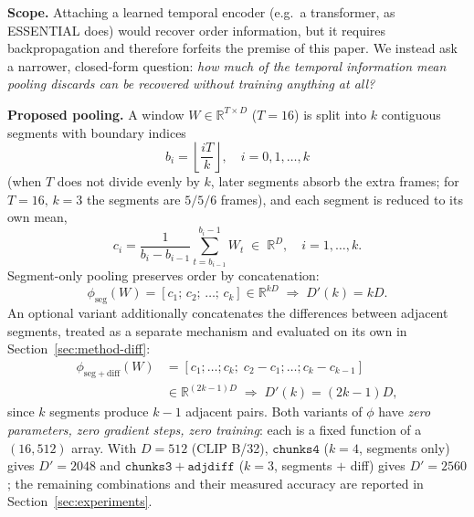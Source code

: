 \documentclass[a4paper,fleqn]{cas-dc}
\begin{document}
\textbf{Scope.} Attaching a learned temporal encoder (e.g.\ a
transformer, as ESSENTIAL does) would recover order information, but it
requires backpropagation and therefore forfeits the premise of this paper.
We instead ask a narrower, closed-form question: \emph{how much of the
temporal information mean pooling discards can be recovered without
training anything at all?}

\textbf{Proposed pooling.} A window $W \in \mathbb{R}^{T \times D}$
($T{=}16$) is split into $k$ contiguous segments with boundary indices
\begin{equation}
b_i = \left\lfloor \frac{iT}{k} \right\rfloor, \quad i = 0,1,\ldots,k
\end{equation}
(when $T$ does not divide evenly by $k$, later segments absorb the extra
frames; for $T{=}16,\,k{=}3$ the segments are $5/5/6$ frames), and each
segment is reduced to its own mean,
\begin{equation}
c_i = \frac{1}{b_i - b_{i-1}} \sum_{t=b_{i-1}}^{b_i - 1} W_t \;\in\; \mathbb{R}^D,
\quad i = 1,\ldots,k .
\end{equation}
Segment-only pooling preserves order by concatenation:
\begin{equation}
\phi_{\mathrm{seg}}(W) = [c_1;\,c_2;\,\ldots;\,c_k] \in \mathbb{R}^{kD}
\;\Longrightarrow\; D'(k) = kD .
\end{equation}
An optional variant additionally concatenates the differences between
adjacent segments, treated as a separate mechanism and evaluated on its own
in Section~\ref{sec:method-diff}:
\begin{equation}
\begin{split}
\phi_{\mathrm{seg+diff}}(W) &= [c_1;\ldots;c_k;\; c_2{-}c_1;\ldots;c_k{-}c_{k-1}]\\
&\in \mathbb{R}^{(2k-1)D}
\;\Longrightarrow\; D'(k) = (2k-1)D ,
\end{split}
\end{equation}
since $k$ segments produce $k{-}1$ adjacent pairs. Both variants of $\phi$
have \emph{zero parameters, zero gradient steps, zero training}: each is a
fixed function of a $(16,512)$ array. With $D{=}512$ (CLIP B/32),
$\mathtt{chunks4}$ ($k{=}4$, segments only) gives $D'{=}2048$ and
$\mathtt{chunks3{+}adjdiff}$ ($k{=}3$, segments $+$ diff) gives $D'{=}2560$;
the remaining combinations and their measured accuracy are reported in
Section~\ref{sec:experiments}.
\end{document}
